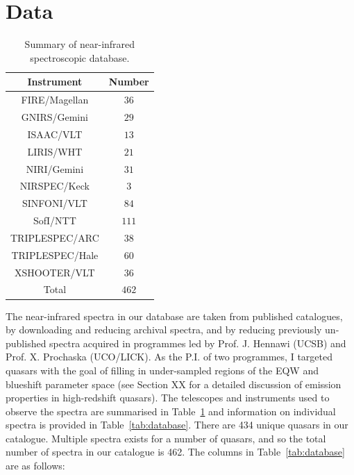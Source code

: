\section{Data}

\begin{table}
  \footnotesize
  \centering
  \caption{Summary of near-infrared spectroscopic database.}
  \label{tab:data_summary}
    \begin{tabular}{cc} 
    \hline
    Instrument & Number \\  
    \hline
    FIRE/Magellan   & $36$ \\
    GNIRS/Gemini    & $29$ \\
    ISAAC/VLT       & $13$  \\
    LIRIS/WHT       & $21$  \\
    NIRI/Gemini     & $31$ \\
    NIRSPEC/Keck    & $3$   \\ 
    SINFONI/VLT     & $84$ \\
    SofI/NTT        & $111$ \\
    TRIPLESPEC/ARC  & $38$ \\
    TRIPLESPEC/Hale & $60$ \\
    XSHOOTER/VLT    & $36$  \\
    \hline
    Total & $462$ \\
    \hline
    \end{tabular}
\end{table}

The near-infrared spectra in our database are taken from published catalogues, by downloading and reducing
archival spectra, and by reducing previously un-published spectra acquired in programmes led by Prof. J. Hennawi (UCSB) and Prof. X. Prochaska (UCO/LICK). 
As the P.I. of two programmes, I targeted quasars with the goal of filling in under-sampled regions of the  EQW and blueshift parameter space (see Section XX for a detailed discussion of  emission properties in high-redshift quasars).
The telescopes and instruments used to observe the spectra are summarised in Table~\ref{tab:data_summary} and information on individual spectra is provided in Table~\ref{tab:database}.
There are 434 unique quasars in our catalogue. 
Multiple spectra exists for a number of quasars, and so the total number of spectra in our catalogue is 462. 
The columns in Table~\ref{tab:database} are as follows: 

